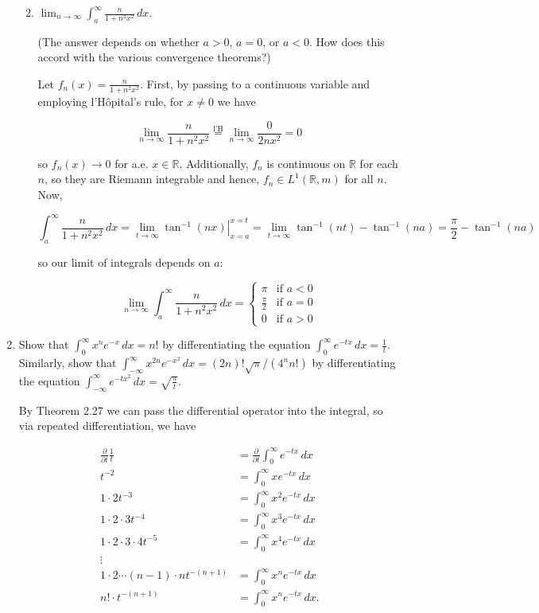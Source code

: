\documentclass[11pt,oneside,english]{amsart}
\theoremstyle{definition}
\newcommand{\lom}[2]{\lim_{{#1}\rightarrow{#2}}}
\newcommand{\R}{\mathbb{R}}
\newcommand{\pp}[2]{\frac{\partial{#1}}{\partial{#2}}}
\begin{document}
\begin{enumerate}
\begin{enumerate}
\pagebreak

\item $\displaystyle \lom{n}{\infty} \int_a^\infty \frac{n}{1+n^2x^2}\,dx$. 

(The answer depends on whether $a>0$, $a=0$, or $a<0$. How does this accord with the various convergence theorems?)

Let $f_n(x)=\frac{n}{1+n^2x^2}$. First, by passing to a continuous variable and employing l'H\^{o}pital's rule, for $x\neq 0$ we have

\[
\lom{n}{\infty}\frac{n}{1+n^2x^2}\stackrel{\text{l'H}}{=}\lom{n}{\infty}\frac{0}{2nx^2}=0
\]

so $f_n(x)\rightarrow 0$ for a.e. $x\in \R$. Additionally, $f_n$ is continuous on $\R$ for each $n$, so they are Riemann integrable and hence, $f_n\in L^1(\R,m)$ for all $n$. Now,

\[
\int_a^\infty \frac{n}{1+n^2x^2}\,dx=\lom{t}{\infty}\left.\tan^{-1}(nx)\right|_{x=a}^{x=t}=\lom{t}{\infty}\tan^{-1}(nt)-\tan^{-1}(na)=\frac{\pi}{2}-\tan^{-1}(na)
\]

so our limit of integrals depends on $a$:

\[
\lom{n}{\infty}\int_a^\infty \frac{n}{1+n^2x^2}\,dx=\begin{cases} \pi & \text{if }a<0\\ \frac{\pi}{2} & \text{if }a=0 \\ 0 & \text{if }a>0\end{cases}
\]

\end{enumerate}

\item Show that $\int_0^\infty x^ne^{-x}\,dx=n!$ by differentiating the equation $\int_0^\infty e^{-tx}\,dx=\frac{1}{t}$. Similarly, show that $\int_{-\infty}^\infty x^{2n}e^{-x^2}\,dx=(2n)!\sqrt{\pi}/(4^nn!)$ by differentiating the equation $\int_{-\infty}^\infty e^{-tx^2}\,dx=\sqrt{\frac{\pi}{t}}$. 


By Theorem 2.27 we can pass the differential operator into the integral, so via repeated differentiation, we have

\begin{align*}
\pp{}{t}\frac{1}{t}&=\pp{}{t}\int_0^\infty e^{-tx}\,dx\\[2mm]
t^{-2}&=\int_0^\infty xe^{-tx}\,dx\\[2mm]
1\cdot2t^{-3}&=\int_0^\infty x^2e^{-tx}\,dx\\[2mm]
1\cdot2\cdot3t^{-4}&=\int_0^\infty x^3e^{-tx}\,dx\\[2mm]
1\cdot2\cdot3\cdot4t^{-5}&=\int_0^\infty x^4e^{-tx}\,dx\\[2mm]
\vdots &\\[2mm]
1\cdot2\cdots(n-1)\cdot nt^{-(n+1)}&=\int_0^\infty x^ne^{-tx}\,dx\\[2mm]
n!\cdot t^{-(n+1)}&=\int_0^\infty x^ne^{-tx}\,dx.\\[2mm]
\end{align*}


\end{enumerate}
\end{document}
